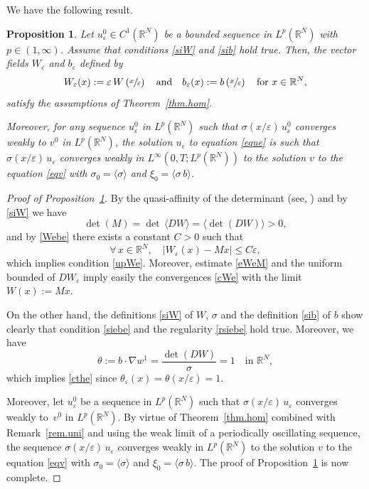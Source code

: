 \documentclass[JEP,XML,SOM,Unicode]{cedram}
\def \RR {\mathbb R}
\theoremstyle{plain}
\newtheorem{Pro}[Thm]{Proposition}
\theoremstyle{definition}
\begin{document}
We have the following result.
\begin{Pro}\label{pro.per}
Let $u_\varepsilon^0\in C^1(\RR^N)$ be a bounded sequence in $L^p(\RR^N)$ with $p\in(1,\infty)$.
Assume that conditions \eqref{siW} and \eqref{sib} hold true.
Then, the vector fields $W_\varepsilon$ and $b_\varepsilon$ defined by
\begin{equation}\label{Webe}
W_\varepsilon(x):=\varepsilon\,W\left(\sfrac{x}{\varepsilon}\right)\quad\mbox{and}\quad b_\varepsilon(x):=b\left(\sfrac{x}{\varepsilon}\right)\quad\mbox{for }x\in\RR^N,
\end{equation}
satisfy the assumptions of Theorem~\ref{thm.hom}.

Moreover, for any sequence $u_\varepsilon^0$ in $L^p(\RR^N)$ such that $\sigma(x/\varepsilon)\,u_\varepsilon^0$ converges weakly to $v^0$ in $L^p(\RR^N)$, the solution $u_\varepsilon$ to equation \eqref{eque} is such that $\sigma(x/\varepsilon)\,u_\varepsilon$ converges weakly in $L^\infty(0,T;L^p(\RR^N))$ to the solution $v$ to the equation \eqref{eqv} with $\sigma_0=\langle\sigma\rangle$ and $\xi_0=\langle\sigma\,b\rangle$.
\end{Pro}

\begin{proof}[Proof of Proposition~\ref{pro.per}]
By the quasi-affinity of the determinant (see, \eg \cite[\S 4.3.2]{Dac}) and by \eqref{siW} we have
\[
\det(M)=\det\,\langle DW\rangle=\big\langle \det(DW)\big\rangle >0,
\]
and by \eqref{Webe} there exists a constant $C>0$ such that
\begin{equation}\label{eWeM}
\forall\,x\in\RR^N,\quad |W_\varepsilon(x)-Mx| \leq C\varepsilon,
\end{equation}
which implies condition \eqref{upWe}.
Moreover, estimate \eqref{eWeM} and the uniform bounded of $DW_\varepsilon$ imply easily the convergences \eqref{cWe} with the limit $W(x):=Mx$.

On the other hand, the definitions \eqref{siW} of $W$, $\sigma$ and the definition \eqref{sib} of $b$ show clearly that condition \eqref{siebe} and the regularity \eqref{rsiebe} hold true.
Moreover, we have
\[
\theta:=b\cdot\nabla w^1= \dfrac{\det(DW)}{\sigma}=1\quad\mbox{in }\RR^N,
\]
which implies \eqref{cthe} since $\theta_\varepsilon(x)=\theta(x/\varepsilon)=1$.

Moreover, let $u_\varepsilon^0$ be a sequence in $L^p(\RR^N)$ such that $\sigma(x/\varepsilon)\,u_\varepsilon$ converges weakly to~$v^0$ in $L^p(\RR^N)$. By virtue of Theorem~\ref{thm.hom} combined with Remark~\ref{rem.uni} and using the weak limit of a periodically oscillating sequence, the sequence $\sigma(x/\varepsilon)\,u_\varepsilon$ converges weakly in $L^p(\RR^N)$ to the solution $v$ to the equation \eqref{eqv} with $\sigma_0=\langle\sigma\rangle$ and $\xi_0=\langle\sigma\,b\rangle$.
The proof of Proposition~\ref{pro.per} is now complete.
\end{proof}
\end{document}
